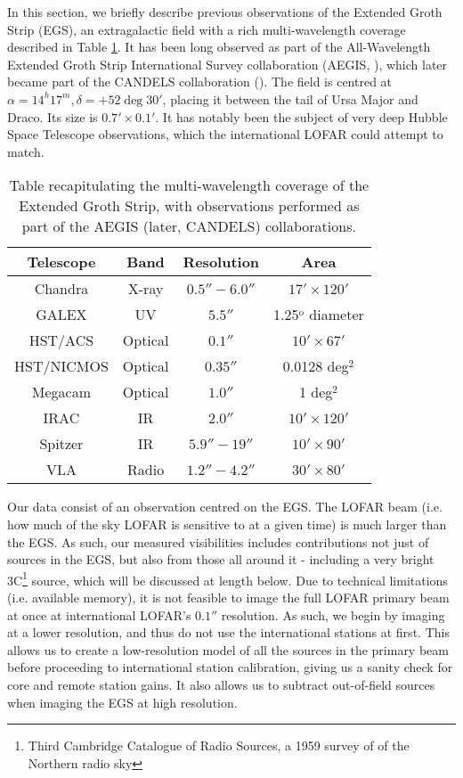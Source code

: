 \pg
In this section, we briefly describe previous observations of the Extended Groth Strip (EGS), an extragalactic field with a rich multi-wavelength coverage described in Table \ref{table.EGS.observation}. It has been long observed as part of the All-Wavelength Extended Groth Strip International Survey collaboration (AEGIS, ), which later became part of the CANDELS collaboration (). The field is centred at $\alpha=14^h17^m,\delta=+52\deg 30'$, placing it between the tail of Ursa Major and Draco. Its size is $0.7'\times 0.1'$. It has notably been the subject of very deep Hubble Space Telescope observations, which the international LOFAR could attempt to match. 

\begin{table}[h!]
\begin{tabular}{cccc}
Telescope    & Band    & Resolution  & Area \\\hline
Chandra      & X-ray   & $0.5''-6.0''$ & $17'\times 120'$ \\
GALEX        & UV      & $5.5''      $ & 1.25$^\text{o}$ diameter \\
HST/ACS      & Optical & $0.1''      $ & $10' \times 67'$\\
HST/NICMOS   & Optical & $0.35''     $ & 0.0128 deg$^2$\\
Megacam      & Optical & $1.0''      $ & 1 deg$^2$\\
IRAC         & IR      & $2.0''      $ & $10' \times 120'$ \\
Spitzer      & IR      & $5.9''-19'' $ & $10'\times 90'$\\
VLA          & Radio   & $1.2''-4.2''$ & $30' \times 80'$
\end{tabular}
\caption{\label{table.EGS.observation}Table recapitulating the multi-wavelength coverage of the Extended Groth Strip, with observations performed as part of the AEGIS (later, CANDELS) collaborations.}
\end{table}


\pg
Our data consist of an observation centred on the EGS. The LOFAR beam (i.e. how much of the sky LOFAR is sensitive to at a given time) is much larger than the EGS. As such, our measured visibilities includes contributions not just of sources in the EGS, but also from those all around it - including a very bright 3C\footnote{Third Cambridge Catalogue of Radio Sources, a 1959 survey of of the Northern radio sky}  source, which will be discussed at length below. Due to technical limitations (i.e. available memory), it is not feasible to image the full LOFAR primary beam at once at international LOFAR's  $0.1''$ resolution. As such, we begin by imaging at a lower resolution, and thus do not use the international stations at first. This allows us to create a low-resolution model of all the sources in the primary beam before proceeding to international station calibration, giving us a sanity check for core and remote station gains. It also allows us to subtract out-of-field sources when imaging the EGS at high resolution.


